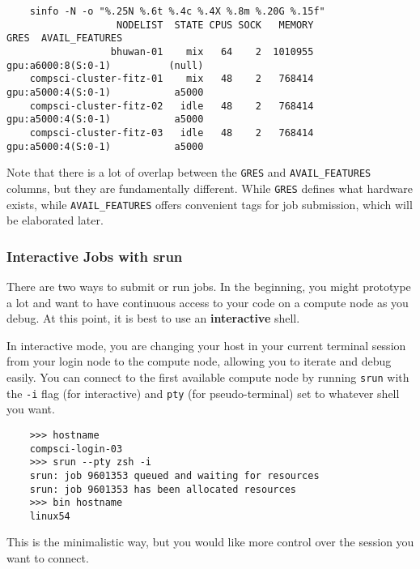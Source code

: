   \begin{lstlisting}
    sinfo -N -o "%.25N %.6t %.4c %.4X %.8m %.20G %.15f"
                   NODELIST  STATE CPUS SOCK   MEMORY                 GRES  AVAIL_FEATURES
                  bhuwan-01    mix   64    2  1010955   gpu:a6000:8(S:0-1)          (null)
    compsci-cluster-fitz-01    mix   48    2   768414   gpu:a5000:4(S:0-1)           a5000
    compsci-cluster-fitz-02   idle   48    2   768414   gpu:a5000:4(S:0-1)           a5000
    compsci-cluster-fitz-03   idle   48    2   768414   gpu:a5000:4(S:0-1)           a5000 
  \end{lstlisting}

  Note that there is a lot of overlap between the \texttt{GRES} and \texttt{AVAIL\_FEATURES} columns, but they are fundamentally different. While \texttt{GRES} defines what hardware exists, while \texttt{AVAIL\_FEATURES} offers convenient tags for job submission, which will be elaborated later. 

\subsubsection{Interactive Jobs with srun}

  There are two ways to submit or run jobs. In the beginning, you might prototype a lot and want to have continuous access to your code on a compute node as you debug. At this point, it is best to use an \textbf{interactive} shell. 

  In interactive mode, you are changing your host in your current terminal session from your login node to the compute node, allowing you to iterate and debug easily. You can connect to the first available compute node by running \texttt{srun} with the \texttt{-i} flag (for interactive) and \texttt{pty} (for pseudo-terminal) set to whatever shell you want. 

  \begin{lstlisting}
    >>> hostname 
    compsci-login-03
    >>> srun --pty zsh -i 
    srun: job 9601353 queued and waiting for resources
    srun: job 9601353 has been allocated resources
    >>> bin hostname
    linux54
  \end{lstlisting}

  This is the minimalistic way, but you would like more control over the session you want to connect. 


